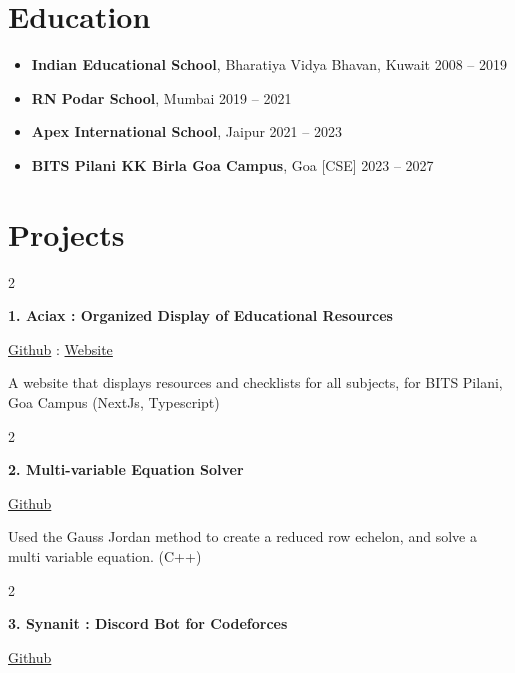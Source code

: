 \documentclass[10pt, letterpaper]{article}
\newenvironment{twocolentry}[2][]{
    \onecolentry
    \def\secondColumn{#2}
    \setcolumnwidth{\fill, 4.7 cm} %
    \begin{paracol}{2}
}{
    \switchcolumn \raggedleft \secondColumn
    \end{paracol}
    \endonecolentry
}
\begin{document}
    \section{Education}
        \begin{itemize}[itemsep=0.2cm] %
            \item \textbf{Indian Educational School}, Bharatiya Vidya Bhavan, Kuwait \hfill 2008 -- 2019
            \item \textbf{RN Podar School}, Mumbai \hfill 2019 -- 2021
            \item \textbf{Apex International School}, Jaipur \hfill 2021 -- 2023
            \item \textbf{BITS Pilani KK Birla Goa Campus}, Goa [CSE] \hfill 2023 -- 2027
        \end{itemize}

    \section{Projects}
        \begin{twocolentry}{
            \href{https://github.com/Darelife/aciax}{Github} : \href{https://aciax.vercel.app/}{Website}
        }
            \textbf{1. Aciax : Organized Display of Educational Resources}
        \end{twocolentry}

        \vspace{0.15 cm} %
        A website that displays resources and checklists for all subjects, for BITS Pilani, Goa Campus (NextJs, Typescript)

        \vspace{0.4 cm} %

        \begin{twocolentry}{
            \href{https://github.com/Darelife/MultiEquationSolver}{Github}
        }
            \textbf{2. Multi-variable Equation Solver}
        \end{twocolentry}

        \vspace{0.15 cm} %
        Used the Gauss Jordan method to create a reduced row echelon, and solve a multi variable equation. (C++)

        \vspace{0.4 cm} %

        \begin{twocolentry}{
            \href{https://github.com/Darelife/synanit2.0}{Github}
        }
            \textbf{3. Synanit : Discord Bot for Codeforces}
        \end{twocolentry}
\end{document}

